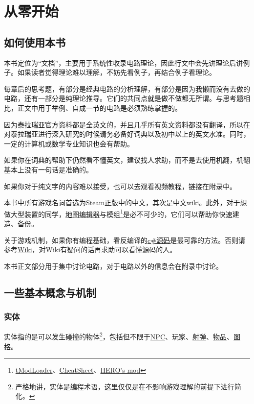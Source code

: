 \chapter{从零开始}

\section{如何使用本书}\label{sec1:1}

本书定位为“文档”，主要用于系统性收录电路理论，因此行文中会先讲理论后讲例子。如果读者觉得理论难以理解，不妨先看例子，再结合例子看理论。

每章后的思考题，有部分是经典电路的分析理解，有部分是因为我懒而没有去做的电路，还有一部分是纯理论推导。它们的共同点就是做不做都无所谓。与思考题相比，正文中用于举例、自成一节的电路是必须熟练掌握的。

因为泰拉瑞亚官方资料都是全英文的，并且几乎所有英文资料都没有翻译，所以在对泰拉瑞亚进行深入研究的时候请务必备好词典以及初中以上的英文水准。同时，一定的计算机或数学专业知识也会有帮助。

如果你在词典的帮助下仍然看不懂英文，建议找人求助，而不是去使用机翻，机翻基本上没有一句话是准确的。

如果你对于纯文字的内容难以接受，也可以去观看视频教程，链接在附录中。

本书中所有游戏名词首选为Steam正版中的中文，其次是中文wiki。此外，对于想做大型装置的同学，\hyperref[app3]{地图编辑器}与模组\footnote{\hyperref[app4]{tModLoader}、\hyperref[app5]{CheatSheet}、\hyperref[app6]{HERO's mod}}是必不可少的，它们可以帮助你快速建造、备份。

关于游戏机制，如果你有编程基础，看反编译的\hyperref[app8]{c\#源码}是最可靠的方法。否则请参考\hyperref[app2]{Wiki}，对Wiki有疑问的话再求助可以看懂源码的人。

本书正文部分用于集中讨论电路，对于电路以外的信息会在附录中讨论。

\section{一些基本概念与机制}

\subsection{实体}
实体指的是可以发生碰撞的物体\footnote{严格地讲，实体是编程术语，这里仅仅是在不影响游戏理解的前提下进行简化。}，包括但不限于\href{https://terraria.gamepedia.com/NPC_IDs}{NPC}、玩家、\href{https://terraria.gamepedia.com/Projectile_IDs}{射弹}、\href{https://terraria.gamepedia.com/Item_IDs}{物品}、\href{https://terraria.gamepedia.com/Tile_IDs}{图格}。

